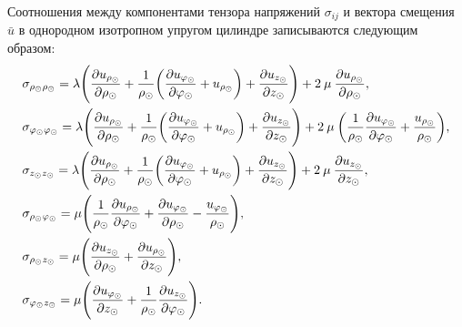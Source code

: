 Соотношения между компонентами тензора напряжений $\sigma_{ij}$ и вектора смещения $\bar{u}$ в однородном изотропном упругом цилиндре записываются следующим образом:
\begin{equation}\label{tenzor_napr}
\begin{aligned}
&\sigma_{\rho_\odot\rho_\odot}=\lambda\Biggl(\frac{\partial u_{\rho_\odot}}{\partial \rho_\odot}+\frac{1}{\rho_\odot}\biggl(\frac{\partial u_{\varphi_\odot}}{\partial\varphi_\odot}+u_{\rho_\odot}\biggr)+\frac{\partial u_{z_\odot}}{\partial z_\odot}\Biggr)+2\:\mu\:\frac{\partial u_{\rho_\odot}}{\partial \rho_\odot},\\
&\sigma_{\varphi_\odot\varphi_\odot}=\lambda\Biggl(\frac{\partial u_{\rho_\odot}}{\partial \rho_\odot}+\frac{1}{\rho_\odot}\biggl(\frac{\partial u_{\varphi_\odot}}{\partial\varphi_\odot}+u_{\rho_\odot}\biggr)+\frac{\partial u_{z_\odot}}{\partial z_\odot}\Biggr)+2\:\mu\:\biggl(\frac{1}{\rho_\odot}\frac{\partial u_{\varphi_\odot}}{\partial\varphi_\odot}+\frac{u_{\rho_\odot}}{\rho_\odot}\biggr),\\
&\sigma_{z_\odot z_\odot}=\lambda\Biggl(\frac{\partial u_{\rho_\odot}}{\partial \rho_\odot}+\frac{1}{\rho_\odot}\biggl(\frac{\partial u_{\varphi_\odot}}{\partial\varphi_\odot}+u_{\rho_\odot}\biggr)+\frac{\partial u_{z_\odot}}{\partial z_\odot}\Biggr)+2\:\mu\:\frac{\partial u_{z_\odot}}{\partial z_\odot},\\
&\sigma_{\rho_\odot\varphi_\odot}=\mu\Biggl(\frac{1}{\rho_\odot}\frac{\partial u_{\rho_\odot}}{\partial\varphi_\odot}+\frac{\partial u_{\varphi_\odot}}{\partial \rho_\odot}-\frac{u_{\varphi_\odot}}{\rho_\odot}\Biggr),\\
&\sigma_{\rho_\odot z_\odot}=\mu\Biggl(\frac{\partial u_{z_\odot}}{\partial \rho_\odot}+\frac{\partial u_{\rho_\odot}}{\partial z_\odot}\Biggr),\\
&\sigma_{\varphi_\odot z_\odot}=\mu\Biggl(\frac{\partial u_{\varphi_\odot}}{\partial z_\odot}+\frac{1}{\rho_\odot}\frac{\partial u_{z_\odot}}{\partial \varphi_\odot}\Biggr).
\end{aligned}
\end{equation}


